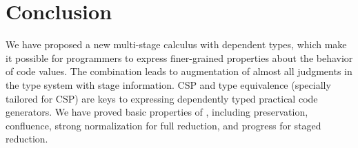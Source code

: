 
\section{Conclusion \label{sec:conclusion}}

We have proposed a new multi-stage calculus \LMD with dependent types,
which make it possible for programmers to express finer-grained
properties about the behavior of code values.  The combination leads
to augmentation of almost all judgments in the type system with stage
information.  CSP and type equivalence (specially tailored for CSP) are
keys to expressing dependently typed practical code generators.  We
have proved basic properties of \LMD, including preservation,
confluence, strong normalization for full reduction, and progress for
staged reduction.
